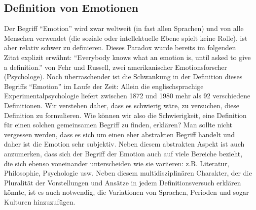 \subsection{Definition von Emotionen} \label{definition-emotionen}



Der Begriff ``Emotion'' wird zwar weltweit  (in fast allen Sprachen) und von alle Menschen verwendet (die soziale oder intellektuelle Ebene spielt keine Rolle), ist aber relativ schwer zu definieren. 
Dieses Paradox wurde bereits im folgenden Zitat explizit erw{\"a}hnt: 
``Everybody knows what an emotion is, until asked to give a definition.''\cite{fehr_russel_1984} von Fehr und Russell, zwei amerikanischer Emotionsforscher (Psychologe). 
Noch {\"u}berraschender ist die Schwankung in der Definition dieses Begriffs ``Emotion'' im Laufe der Zeit: Allein die englischsprachige Experimentalpsychologie\cite{plamper12} liefert zwischen 1872 und 1980 mehr als 92 verschiedene Definitionen. 
Wir verstehen daher, dass es schwierig w{\"a}re, zu versuchen, diese Definition zu formulieren.  
Wie k{\"o}nnen wir also die Schwierigkeit, eine Definition f{\"u}r einen solchen gemeinsamen Begriff zu finden, erkl{\"a}ren? 
Man sollte nicht vergessen werden, dass es sich um einen eher abstrakten Begriff handelt und daher ist die Emotion sehr subjektiv. 
Neben diesem abstrakten Aspekt ist auch anzumerken, dass sich der Begriff der Emotion auch auf viele Bereiche bezieht, die sich ebenso voneinander unterscheiden wie sie variieren: z.B. Literatur, Philosophie, Psychologie usw. 
Neben diesem multidisziplin{\"a}ren Charakter, der die Pluralit{\"a}t der Vorstellungen und Ans{\"a}tze in jedem Definitionsversuch erkl{\"a}ren k{\"o}nnte, ist es auch notwendig, die Variationen von Sprachen, Perioden und sogar Kulturen hinzuzuf{\"u}gen. \\


